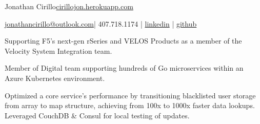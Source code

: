 \documentclass[]{deedy-resume-openfont}
\begin{document}
%
%


\namesection \LARGE {{Jonathan} {Cirillo}}{\href{https://cirillojon.herokuapp.com/}{cirillojon.herokuapp.com}}

\vspace{18pt}

\newcommand{\linkedin}[1]{\faLinkedin\hspace{0.5em}\href{https://linkedin.com/in/#1}{\texttt{#1}}}
\newcommand{\github}[1]{\faGithub\hspace{0.5em}\href{https://github.com/#1}{\texttt{#1}}}

{\FA \faEnvelope} {\href{mailto:jonathancirillo@outlook.com}{jonathancirillo@outlook.com}}\hspace{5pt}|\hspace{5pt}{\FA \faPhone} 407.718.1174 |\hspace{5pt} {\FA \faLinkedin} {\href{https://linkedin.com/in/jonathan-cirillo/}{linkedin}} \hspace{5pt}|\hspace{5pt} {\FA \faGithub} {\href{https://github.com/cirillojon}{github}}


\vspace{6pt}



\begin{tightemize}
\item Supporting F5's next-gen rSeries and VELOS Products as a member of the Velocity System Integration team.
\end{tightemize}
\sectionsep


\begin{tightemize}
\item Member of Digital team supporting hundreds of Go microservices within an Azure Kubernetes environment.
\item Optimized a core service’s performance by transitioning blacklisted user storage from array to map structure, achieving from 100x to 1000x faster data lookups. Leveraged CouchDB \& Consul for local testing of updates.
\end{tightemize}
\sectionsep
\end{document}
